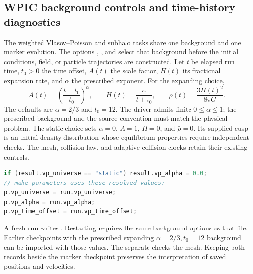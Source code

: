 \subsection{WPIC background controls and time-history diagnostics}
\label{sec:wpic-diagnostics}

The weighted Vlasov--Poisson and subhalo tasks share one background and one
marker evolution. The options , , and
 select that background before the initial conditions,
field, or particle trajectories are constructed. Let \(t\) be elapsed run
time, \(t_0>0\) the time offset, \(A(t)\) the scale factor, \(H(t)\) its
fractional expansion rate, and \(\alpha\) the prescribed exponent. For the
expanding choice,
\[
 A(t)=\left(\frac{t+t_0}{t_0}\right)^\alpha,\qquad
 H(t)=\frac{\alpha}{t+t_0},\qquad
 \bar\rho(t)=\frac{3H(t)^2}{8\pi G}.                    \tag{WPIC-D1}
\]
The defaults are \(\alpha=2/3\) and \(t_0=12\). The driver admits finite
\(0\le\alpha\le1\); the prescribed background and the source convention
must match the physical problem. The static choice sets \(\alpha=0\),
\(A=1\), \(H=0\), and \(\bar\rho=0\). Its supplied cusp is an initial
density distribution whose equilibrium properties require independent checks.
The mesh, collision law, and adaptive collision clocks retain their existing
controls.

\begin{lstlisting}[language=C++]
if (result.vp_universe == "static") result.vp_alpha = 0.0;
// make_parameters uses these resolved values:
p.vp_universe = run.vp_universe;
p.vp_alpha = run.vp_alpha;
p.vp_time_offset = run.vp_time_offset;
\end{lstlisting}

A fresh run writes . Restarting requires the
same background options as that file. Earlier checkpoints with the prescribed
expanding \(\alpha=2/3,t_0=12\) background can be imported with those values.
The separate  checks the mesh. Keeping both
records beside the marker checkpoint preserves the interpretation of saved
positions and velocities.

